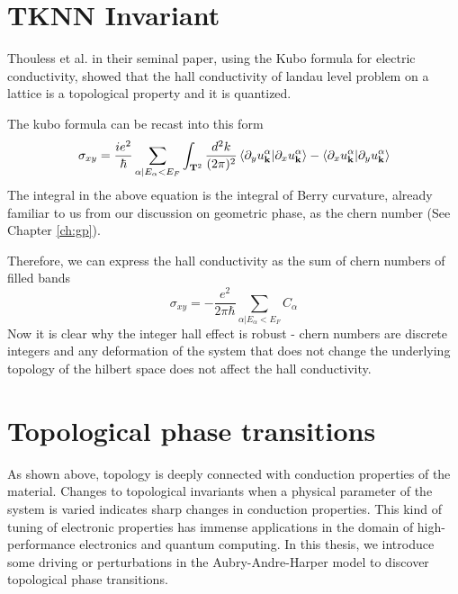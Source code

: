 \section{TKNN Invariant}
Thouless et al. in their seminal paper, using the Kubo formula for electric conductivity, showed that the hall conductivity of landau level problem on a lattice is a topological property
and it is quantized.

The kubo formula can be recast into this form \cite{tong2016lectures, kohmoto1985topological}
\begin{equation}
 \sigma_{xy} = \frac{ie^2}{\hbar} \sum_{\alpha | E_{\alpha}<E_{F}}\int_{\mathbf{T}^2}\frac{d^2 k}{(2\pi)^2} \braket{\partial_{y}u_{\mathbf{k}}^\alpha | \partial_{x} u_{\mathbf{k}}^\alpha} - \braket{\partial_{x}u_{\mathbf{k}}^\alpha | \partial_{y} u_{\mathbf{k}}^\alpha}
\end{equation}
The integral in the above equation is the integral of Berry curvature, already familiar to us from our discussion on geometric phase, as the chern number (See Chapter \ref{ch:gp}).

Therefore, we can express the hall conductivity as the sum of chern numbers of filled bands
\begin{equation}
 \sigma_{xy} = -\frac{e^2}{2\pi\hbar}\sum_{\alpha | E_{\alpha} < E_{F}} C_{\alpha}
\end{equation}
Now it is clear why the integer hall effect is robust - chern numbers are discrete integers and any deformation of the system that does not change the underlying topology of the hilbert space
does not affect the hall conductivity.

\section{Topological phase transitions}
As shown above, topology is deeply connected with conduction properties of the material. Changes to topological invariants when a physical parameter of the system is varied indicates
sharp changes in conduction properties. This kind of tuning of electronic properties has immense applications in the domain of high-performance electronics and quantum computing.
In this thesis, we introduce some driving or perturbations in the Aubry-Andre-Harper model to discover topological phase transitions.